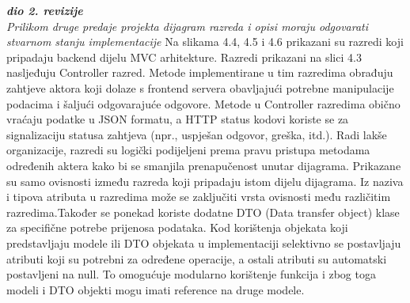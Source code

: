 			\textbf{\textit{dio 2. revizije}}\\			
			
			\textit{Prilikom druge predaje projekta dijagram razreda i opisi moraju odgovarati stvarnom stanju implementacije}
		\fi
			Na slikama 4.4, 4.5 i 4.6 prikazani su razredi koji pripadaju backend dijelu MVC arhitekture. Razredi prikazani na slici 4.3 nasljeđuju Controller razred. Metode implementirane u tim razredima obrađuju zahtjeve aktora koji dolaze s frontend servera obavljajući potrebne manipulacije podacima i šaljući odgovarajuće odgovore. Metode u Controller razredima obično vraćaju podatke u JSON formatu, a HTTP status kodovi koriste se za signalizaciju statusa zahtjeva (npr., uspješan odgovor, greška, itd.). Radi lakše organizacije, razredi su logički podijeljeni prema pravu pristupa metodama određenih aktera kako bi se smanjila prenapučenost unutar dijagrama. Prikazane su samo ovisnosti između razreda koji pripadaju istom dijelu dijagrama. Iz naziva i tipova atributa u razredima može se zaključiti vrsta ovisnosti među različitim razredima.Također se ponekad koriste dodatne DTO (Data transfer object) klase za specifične potrebe prijenosa podataka. Kod korištenja objekata koji predstavljaju modele ili DTO objekata u implementaciji selektivno se postavljaju atributi koji su potrebni za određene operacije, a ostali atributi su automatski postavljeni na null. To omogućuje modularno korištenje funkcija i zbog toga modeli i DTO objekti mogu imati reference na druge modele.
			
			\eject
		
			\vspace{12pt}						
			
